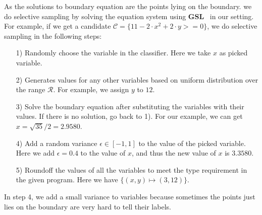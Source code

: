 As the solutions to boundary equation are the points lying on the boundary.
we do selective sampling by solving the equation system using \textbf{GSL}~\cite{gough2009gnu} in our setting.
For example, if we get a candidate $\mathcal{C} = \{11-2\cdot x^2+2\cdot y>=0\}$,
we do selective sampling in the following steps:
\begin{itemize}
\item[1)] Randomly choose the variable in the classifier. Here we take $x$ as picked variable.
\item[2)] Generates values for any other variables based on uniform distribution over the range $\mathcal{R}$. For example, we assign $y$ to $12$.
\item[3)] Solve the boundary equation after substituting the variables with their values. If there is no solution, go back to 1). For our example, we can get $x = \sqrt{35}/2 = 2.9580$.
\item[4)] Add a random variance $\epsilon \in [-1, 1]$ to the value of the picked variable. Here we add $\epsilon = 0.4$ to the value of $x$, and thus the new value of $x$ is $3.3580$.
\item[5)] Roundoff the values of all the variables to meet the type requirement in the given program. Here we have $\{(x,y) \mapsto (3, 12)\}$.
\end{itemize}

In step 4, we add a small variance to variables because sometimes the points just lies on the boundary are very hard to tell their labels.


